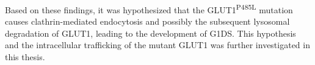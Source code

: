 Based on these findings, it was hypothesized that the GLUT1\textsuperscript{P485L} mutation causes clathrin-mediated endocytosis and possibly the subsequent lysosomal degradation of GLUT1, leading to the development of G1DS. This hypothesis and the intracellular trafficking of the mutant GLUT1 was further investigated in this thesis.

